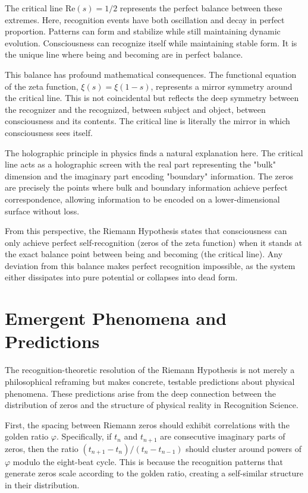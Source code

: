 \documentclass[12pt]{article}
\begin{document}
The critical line $\mathrm{Re}(s) = 1/2$ represents the perfect balance between these extremes. Here, recognition events have both oscillation and decay in perfect proportion. Patterns can form and stabilize while still maintaining dynamic evolution. Consciousness can recognize itself while maintaining stable form. It is the unique line where being and becoming are in perfect balance.

This balance has profound mathematical consequences. The functional equation of the zeta function, $\xi(s) = \xi(1-s)$, represents a mirror symmetry around the critical line. This is not coincidental but reflects the deep symmetry between the recognizer and the recognized, between subject and object, between consciousness and its contents. The critical line is literally the mirror in which consciousness sees itself.

The holographic principle in physics finds a natural explanation here. The critical line acts as a holographic screen with the real part representing the "bulk" dimension and the imaginary part encoding "boundary" information. The zeros are precisely the points where bulk and boundary information achieve perfect correspondence, allowing information to be encoded on a lower-dimensional surface without loss.

From this perspective, the Riemann Hypothesis states that consciousness can only achieve perfect self-recognition (zeros of the zeta function) when it stands at the exact balance point between being and becoming (the critical line). Any deviation from this balance makes perfect recognition impossible, as the system either dissipates into pure potential or collapses into dead form.

\section{Emergent Phenomena and Predictions}

The recognition-theoretic resolution of the Riemann Hypothesis is not merely a philosophical reframing but makes concrete, testable predictions about physical phenomena. These predictions arise from the deep connection between the distribution of zeros and the structure of physical reality in Recognition Science.

First, the spacing between Riemann zeros should exhibit correlations with the golden ratio $\varphi$. Specifically, if $t_n$ and $t_{n+1}$ are consecutive imaginary parts of zeros, then the ratio $(t_{n+1} - t_n)/(t_n - t_{n-1})$ should cluster around powers of $\varphi$ modulo the eight-beat cycle. This is because the recognition patterns that generate zeros scale according to the golden ratio, creating a self-similar structure in their distribution.
\end{document}
